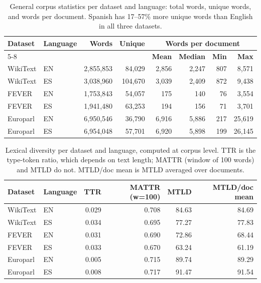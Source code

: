 \documentclass[11pt]{article}
\begin{document}
\begin{table}[h!]
\centering
\caption{General corpus statistics per dataset and language: total words, unique words, and words per document. Spanish has 17--57\% more unique words than English in all three datasets.}
\label{tabS:general-stats}
\scriptsize
\begin{tabular*}{\textwidth}{@{\extracolsep{\fill}}@{}llrrrrrr@{}}
\toprule
\textbf{Dataset} & \textbf{Language} & \textbf{Words} & \textbf{Unique} & \multicolumn{4}{c}{\textbf{Words per document}} \\
\cmidrule(lr){5-8}
 & & & & \textbf{Mean} & \textbf{Median} & \textbf{Min} & \textbf{Max} \\
\midrule
WikiText & EN & 2,855,853 & 84,029 & 2,856 & 2,247 & 807 & 8,571 \\
WikiText & ES & 3,038,960 & 104,670 & 3,039 & 2,409 & 872 & 9,438 \\
\midrule
FEVER    & EN & 1,753,843 & 54,057 & 175 & 140 & 76 & 3,554 \\
FEVER    & ES & 1,941,480 & 63,253 & 194 & 156 & 71 & 3,701 \\
\midrule
Europarl & EN & 6,950,546 & 36,790 & 6,916 & 5,886 & 217 & 25,619 \\
Europarl & ES & 6,954,048 & 57,701 & 6,920 & 5,898 & 199 & 26,145 \\
\bottomrule
\end{tabular*}
\end{table}

\begin{table}[h!]
\centering
\caption{Lexical diversity per dataset and language, computed at corpus level. TTR is the type-token ratio, which depends on text length; MATTR (window of 100 words) and MTLD do not. MTLD/doc mean is MTLD averaged over documents.}
\label{tabS:lexical-stats}
\scriptsize
\begin{tabular*}{\textwidth}{@{\extracolsep{\fill}}llrrrr}
\toprule
\textbf{Dataset} & \textbf{Language} & \textbf{TTR} & \textbf{MATTR (w=100)} & \textbf{MTLD} & \textbf{MTLD/doc mean} \\
\midrule
WikiText & EN & 0.029 & 0.708 & 84.63 & 84.69 \\
WikiText & ES & 0.034 & 0.695 & 77.27 & 77.83 \\
\midrule
FEVER & EN & 0.031 & 0.690 & 72.86 & 68.44 \\
FEVER & ES & 0.033 & 0.670 & 63.24 & 61.19 \\
\midrule
Europarl & EN & 0.005 & 0.715 & 89.74 & 89.29 \\
Europarl & ES & 0.008 & 0.717 & 91.47 & 91.54 \\
\bottomrule
\end{tabular*}
\end{table}
\end{document}
